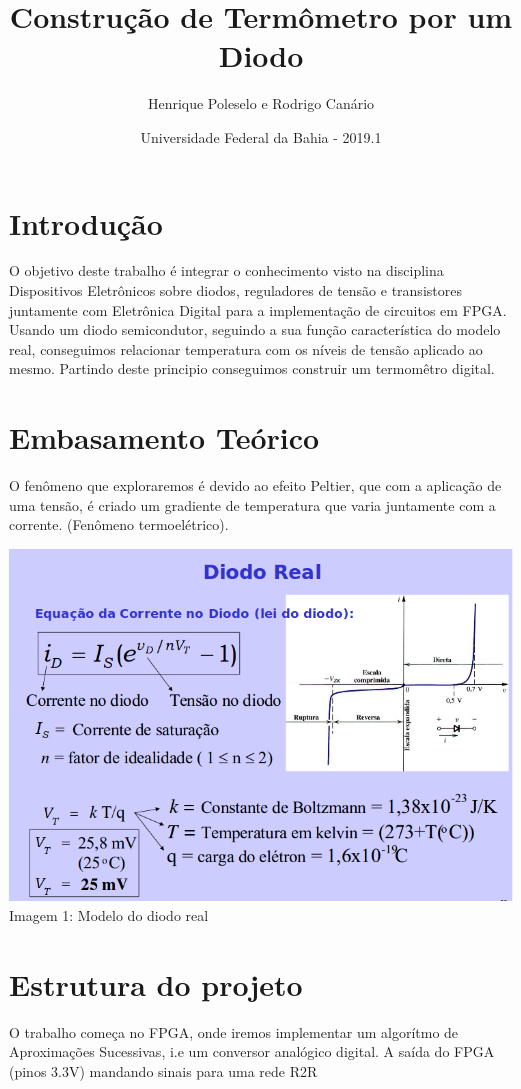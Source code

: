 \documentclass{article}
\title{Construção de Termômetro por um Diodo}
\author{Henrique Poleselo e Rodrigo Canário}
\date{Universidade Federal da Bahia - 2019.1}
\begin{document}
\maketitle

\section{Introdução}
O objetivo deste trabalho é integrar o conhecimento visto na disciplina Dispositivos Eletrônicos sobre diodos, reguladores de tensão e transistores juntamente com Eletrônica Digital para a implementação de circuitos em FPGA.
Usando um diodo semicondutor, seguindo a sua função característica do modelo real, conseguimos relacionar temperatura com os níveis de tensão aplicado ao mesmo. Partindo deste principio conseguimos construir um termomêtro digital.

\section{Embasamento Teórico}
 O fenômeno que exploraremos é devido ao efeito Peltier, que com a aplicação de uma tensão, é criado um gradiente de temperatura que varia juntamente com a corrente. (Fenômeno termoelétrico).
\begin{center}
    \includegraphics[scale=0.3]{images/img1.png}
    Imagem 1: Modelo do diodo real
\end{center}

\section{Estrutura do projeto}
O trabalho começa no FPGA, onde iremos implementar um algorítmo de Aproximações Sucessivas, i.e um conversor analógico digital. A saída do FPGA (pinos 3.3V) mandando sinais para uma rede R2R
\end{document}
